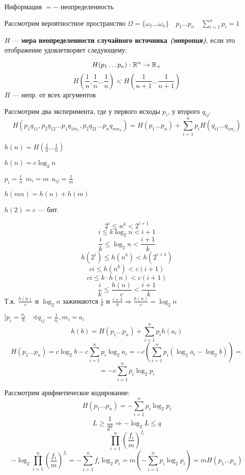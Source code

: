 

\cfoot{}



Информация $=-$ неопределенность

Рассмотрим вероятностное пространство $\Omega=\{\omega_1\ldots \omega_n\} \quad p_1\ldots p_n \quad \sum\limits_{i=1}^n p_i=1$

\begin{definition}
    $H$ --- \textbf{мера неопределенности случайного источника \textit{(энтропия)}}, если это отображение удовлетворяет следующему:
\end{definition}
$$H(p_1\ldots p_n) : \mathbb{R}^n\to\mathbb{R}_+$$
$$H(\frac{1}{n},\frac{1}{n}\ldots \frac{1}{n}) < H(\frac{1}{n+1}\ldots \frac{1}{n+1})$$
$H$ --- непр. от всех аргументов

Рассмотрим два эксперимента, где у первого исходы $p_i$, у второго $q_{ij}$.
$$H(p_1q_{11}, p_2q_{12}\ldots p_1q_{1m_1}, p_2q_{21}\ldots p_nq_{nm_n})=H(p_1\ldots p_n)+\sum\limits_{i=1}^n p_iH(q_{i1}\ldots q_{im_i})$$

$h(n)=H(\frac{1}{n}\ldots\frac{1}{n})$

\begin{lemma}
    $h(n)=c\log_2 n$
\end{lemma}

$p_i=\frac{1}{n} \ \ m_i=m \ \ a_{ij}=\frac{1}{m}$

$h(mn)=h(n)+h(m)$

$h(2)=c$ --- бит.

$$2^i\leq n^k < 2^{i+1}$$
$$i\leq k\log_2 n < i+1$$
$$\frac{i}{k}\leq\log_2 n<\frac{i+1}{k}$$
$$h(2^i)\leq h(n^k) < h(2^{i+1})$$
$$ci\leq h(n^k) < c(i+1)$$
$$ci\leq k\cdot h(n) < c(i+1)$$
$$\frac{i}{k}\leq \frac{h(n)}{c} < \frac{i+1}{k}$$
Т.к. $\frac{h(n)}{c}$ и $\log_2 n$ зажимаются $\frac{i}{k}$ и $\frac{i+1}{k} \Rightarrow \frac{h(n)}{c}=\log_2 n$

$] p_i=\frac{a_i}{b} \quad \sphericalangle q_{ij}=\frac{1}{a_i}, m_i=a_i$
$$h(b)=H(p_1\ldots p_n) + \sum\limits_{i=1}^n p_ih(a_i)$$
$$H(p_1\ldots p_n)=c\log_2 b - c\sum\limits_{i=1}^n p_i\log_2 a_i = -c\left(\sum\limits_{i=1}^n p_i(\log_2a_i-\log_2b)\right)=$$
$$=-c\sum\limits_{i=1}^n p_i\log_2p_i$$

Рассмотрим арифметическое кодирование:
$$H(p_1 \ldots p_n)=-\sum\limits_{i=1}^n p_i\log_2 p_i$$
$$L\geq \frac{1}{2^q} \Rightarrow -\log_2 L \leq q$$
$$\prod\limits_{i=1}^n\left(\frac{f_i}{m}\right)^{f_i}$$
$$-\log_2 \prod\limits_{i=1}^n\left(\frac{f_i}{m}\right)^{f_i}=-\sum\limits_{i=1}^n f_i\log_2 p_i = m\left(-\sum\limits_{i=1}^n p_i\log_2 p_i\right)=mH(p_1\ldots p_n)$$

